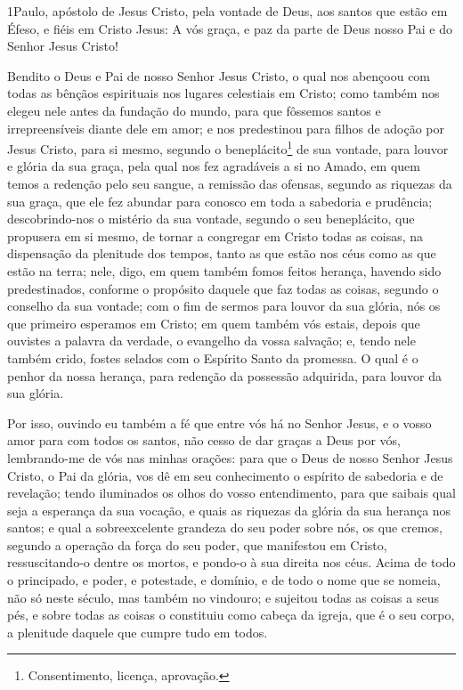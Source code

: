 
\lettrine{1} Paulo, apóstolo de Jesus Cristo, pela vontade de
Deus, aos santos que estão em Éfeso, e fiéis em Cristo Jesus: A
vós graça, e paz da parte de Deus nosso Pai e do Senhor Jesus
Cristo!

Bendito o Deus e Pai de nosso Senhor Jesus Cristo, o qual nos
abençoou com todas as bênçãos espirituais nos lugares celestiais em
Cristo; como também nos elegeu nele antes da fundação do mundo,
para que fôssemos santos e irrepreensíveis diante dele em amor;
e nos predestinou para filhos de adoção por Jesus Cristo, para
si mesmo, segundo o beneplácito\footnote{Consentimento, licença,
aprovação.} de sua vontade, para louvor e glória da sua graça,
pela qual nos fez agradáveis a si no Amado, em quem temos a
redenção pelo seu sangue, a remissão das ofensas, segundo as
riquezas da sua graça, que ele fez abundar para conosco em toda
a sabedoria e prudência; descobrindo-nos o mistério da sua
vontade, segundo o seu beneplácito, que propusera em si mesmo,
de tornar a congregar em Cristo todas as coisas, na
dispensação da plenitude dos tempos, tanto as que estão nos céus
como as que estão na terra; nele, digo, em quem também fomos
feitos herança, havendo sido predestinados, conforme o propósito
daquele que faz todas as coisas, segundo o conselho da sua vontade;
com o fim de sermos para louvor da sua glória, nós os que
primeiro esperamos em Cristo; em quem também vós estais,
depois que ouvistes a palavra da verdade, o evangelho da vossa
salvação; e, tendo nele também crido, fostes selados com o Espírito
Santo da promessa. O qual é o penhor da nossa herança, para
redenção da possessão adquirida, para louvor da sua glória.

Por isso, ouvindo eu também a fé que entre vós há no Senhor
Jesus, e o vosso amor para com todos os santos, não cesso de
dar graças a Deus por vós, lembrando-me de vós nas minhas orações:
para que o Deus de nosso Senhor Jesus Cristo, o Pai da
glória, vos dê em seu conhecimento o espírito de sabedoria e de
revelação; tendo iluminados os olhos do vosso entendimento,
para que saibais qual seja a esperança da sua vocação, e quais as
riquezas da glória da sua herança nos santos; e qual a
sobreexcelente grandeza do seu poder sobre nós, os que cremos,
segundo a operação da força do seu poder, que manifestou em
Cristo, ressuscitando-o dentre os mortos, e pondo-o à sua direita
nos céus. Acima de todo o principado, e poder, e potestade, e
domínio, e de todo o nome que se nomeia, não só neste século, mas
também no vindouro; e sujeitou todas as coisas a seus pés, e
sobre todas as coisas o constituiu como cabeça da igreja, que
é o seu corpo, a plenitude daquele que cumpre tudo em todos.

